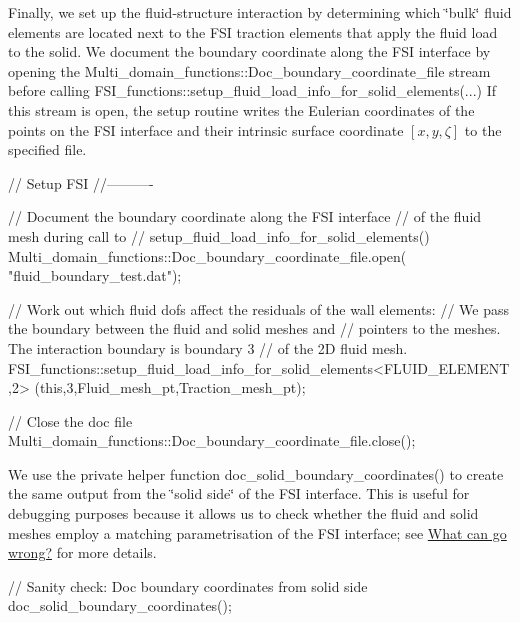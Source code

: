 Finally, we set up the fluid-\/structure interaction by determining which \char`\"{}bulk\char`\"{} fluid elements are located next to the F\+SI traction elements that apply the fluid load to the solid. We document the boundary coordinate along the F\+SI interface by opening the {\ttfamily Multi\+\_\+domain\+\_\+functions\+::\+Doc\+\_\+boundary\+\_\+coordinate\+\_\+file} stream before calling {\ttfamily F\+S\+I\+\_\+functions\+::setup\+\_\+fluid\+\_\+load\+\_\+info\+\_\+for\+\_\+solid\+\_\+elements}(...) If this stream is open, the setup routine writes the Eulerian coordinates of the points on the F\+SI interface and their intrinsic surface coordinate $ [ x, y, \zeta ] $ to the specified file.


\begin{DoxyCodeInclude}


 \textcolor{comment}{// Setup FSI}
 \textcolor{comment}{//----------}

 \textcolor{comment}{// Document the boundary coordinate  along the FSI interface }
 \textcolor{comment}{// of the fluid mesh during call to}
 \textcolor{comment}{// setup\_fluid\_load\_info\_for\_solid\_elements()}
 Multi\_domain\_functions::Doc\_boundary\_coordinate\_file.open(
  \textcolor{stringliteral}{"fluid\_boundary\_test.dat"});

 \textcolor{comment}{// Work out which fluid dofs affect the residuals of the wall elements:}
 \textcolor{comment}{// We pass the boundary between the fluid and solid meshes and }
 \textcolor{comment}{// pointers to the meshes. The interaction boundary is boundary 3}
 \textcolor{comment}{// of the 2D fluid mesh.}
 FSI\_functions::setup\_fluid\_load\_info\_for\_solid\_elements<FLUID\_ELEMENT,2>
  (\textcolor{keyword}{this},3,Fluid\_mesh\_pt,Traction\_mesh\_pt);
 
 \textcolor{comment}{// Close the doc file}
 Multi\_domain\_functions::Doc\_boundary\_coordinate\_file.close();

\end{DoxyCodeInclude}


We use the private helper function {\ttfamily doc\+\_\+solid\+\_\+boundary\+\_\+coordinates()} to create the same output from the \char`\"{}solid side\char`\"{} of the F\+SI interface. This is useful for debugging purposes because it allows us to check whether the fluid and solid meshes employ a matching parametrisation of the F\+SI interface; see \hyperlink{index_go_wrong}{What can go wrong?} for more details.


\begin{DoxyCodeInclude}

 \textcolor{comment}{// Sanity check: Doc boundary coordinates from solid side}
 doc\_solid\_boundary\_coordinates();

\end{DoxyCodeInclude}


